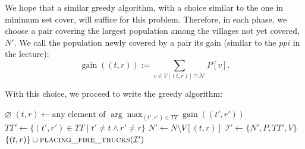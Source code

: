 \documentclass[12pt,a4paper]{article}
\begin{document}
We hope that a similar greedy algorithm, with a choice similar to the one in
minimum set cover, will suffice for this problem. Therefore, in each phase,
we choose a pair covering the largest population among the villages not yet covered,
$N'$. We call the population newly covered by a pair its gain
(similar to the $ppi$ in the lecture):
\[
\operatorname{gain}((t,r)):=\sum_{v\in V[(t,r)]\cap N'}P[v].
\]

With this choice, we proceed to write the greedy algorithm:
\begin{algorithm}[H]
\caption{$\textit{placing\_fire\_trucks}(\mathcal{I})$}
\begin{algorithmic}
    \State \Return $\varnothing$
\EndIf
\State $(t,r)\gets\text{any element of }\arg\max_{(t',r')\in TT}\operatorname{gain}((t',r'))$
\State $TT'\gets\{(t',r')\in TT\mid t'\neq t\land r'\neq r\}$
\State $N'\gets N\setminus V[(t,r)]$
\State $\mathcal{I}'\gets\{N',P,TT',V\}$
\State \Return $\{(t,r)\}\cup\Call{placing\_fire\_trucks}{\mathcal{I}'}$
\end{algorithmic}
\end{algorithm}
\end{document}
